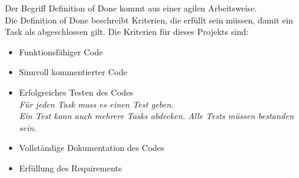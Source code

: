 Der Begriff Definition of Done kommt aus einer agilen Arbeitsweise.\\
Die Definition of Done beschreibt Kriterien, die erfüllt sein müssen, damit ein Task als abgeschlossen gilt.
Die Kriterien für dieses Projekts sind:
\begin{itemize}
    \item Funktionsfähiger Code
    \item Sinnvoll kommentierter Code
    \item Erfolgreiches Testen des Codes\\ \textit{Für jeden Task muss es einen Test geben.
    \\Ein Test kann auch mehrere Tasks abdecken. Alle Tests müssen bestanden sein.}
    \item Vollständige Dokumentation des Codes
    \item Erfüllung des Requirements
    
\end{itemize}
